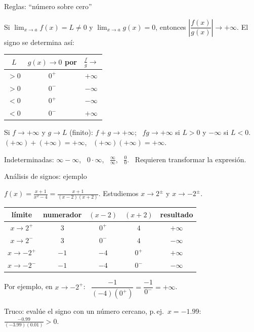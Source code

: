 \documentclass[10pt,aspectratio=169]{beamer}
\begin{document}
\begin{frame}{Reglas: ``número sobre cero''}
  \begin{teorema}
    Si $\lim_{x\to a}f(x)=L\neq0$ y $\lim_{x\to a}g(x)=0$, entonces $\left|\dfrac{f(x)}{g(x)}\right|\to+\infty$. El signo se determina así:
    \begin{center}
      \renewcommand{\arraystretch}{1.3}
      \begin{tabular}{c|c|c}
        $L$ & $g(x)\to0$ por & $\frac fg\to$\\ \hline
        $>0$ & $0^+$ & $+\infty$\\
        $>0$ & $0^-$ & $-\infty$\\
        $<0$ & $0^+$ & $-\infty$\\
        $<0$ & $0^-$ & $+\infty$
      \end{tabular}
    \end{center}
  \end{teorema}
  \begin{proposicion}
    Si $f\to+\infty$ y $g\to L$ (finito): $f+g\to+\infty$; \ $fg\to+\infty$ si $L>0$ y $-\infty$ si $L<0$. \
    $(+\infty)+(+\infty)=+\infty$, \ $(+\infty)(+\infty)=+\infty$.
  \end{proposicion}
  \small \alert{Indeterminadas:} $\infty-\infty$, \ $0\cdot\infty$, \ $\frac\infty\infty$, \ $\frac00$. \ Requieren transformar la expresión.
\end{frame}

\begin{frame}{Análisis de signos: ejemplo}
  \begin{ejemplo}[4]
    $\displaystyle f(x)=\frac{x+1}{x^2-4}=\frac{x+1}{(x-2)(x+2)}$. Estudiemos $x\to2^\pm$ y $x\to-2^\pm$.
    \begin{center}
      \renewcommand{\arraystretch}{1.3}
      \begin{tabular}{c|c|c|c|c}
        límite & numerador & $(x-2)$ & $(x+2)$ & resultado\\ \hline
        $x\to2^+$ & $3$ & $0^+$ & $4$ & $+\infty$\\
        $x\to2^-$ & $3$ & $0^-$ & $4$ & $-\infty$\\
        $x\to-2^+$ & $-1$ & $-4$ & $0^+$ & $+\infty$\\
        $x\to-2^-$ & $-1$ & $-4$ & $0^-$ & $-\infty$
      \end{tabular}
    \end{center}
    Por ejemplo, en $x\to-2^+$: \ $\dfrac{-1}{(-4)(0^+)}=\dfrac{-1}{0^-}=+\infty$.
  \end{ejemplo}
  \small Truco: evalúe el signo con un número cercano, p.\,ej.\ $x=-1.99$: \ $\frac{-0.99}{(-3.99)(0.01)}>0$.
\end{frame}
\end{document}

